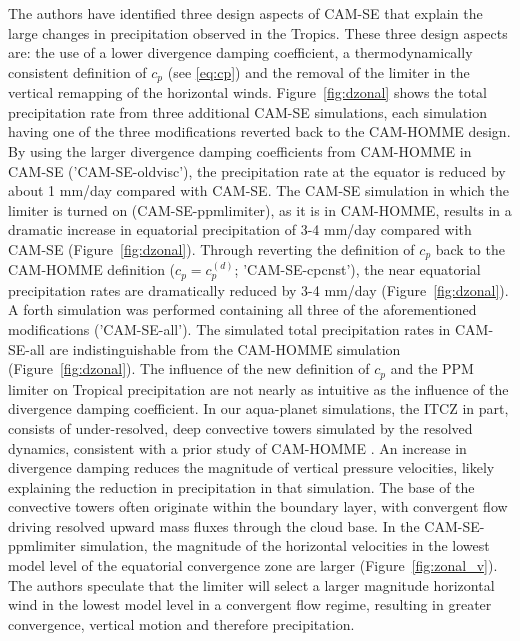 The authors have identified three design aspects of CAM-SE that explain the large changes in precipitation observed in the Tropics. These three design aspects are: the use of a lower divergence damping coefficient, a thermodynamically consistent definition of $c_p$ (see \eqref{eq:cp}) and the removal of the limiter in the vertical remapping of the horizontal winds. Figure~\ref{fig:dzonal} shows the total precipitation rate from three additional CAM-SE simulations, each simulation having one of the three modifications reverted back to the CAM-HOMME design. By using the larger divergence damping coefficients from CAM-HOMME in CAM-SE ('CAM-SE-oldvisc'), the precipitation rate at the equator is reduced by about 1 mm/day compared with CAM-SE. The CAM-SE simulation in which the limiter is turned on (CAM-SE-ppmlimiter), as it is in CAM-HOMME, results in a dramatic increase in equatorial precipitation of 3-4 mm/day compared with CAM-SE (Figure~\ref{fig:dzonal}). Through reverting the definition of $c_p$ back to the CAM-HOMME definition ($c_p = c_p^{(d)}$; 'CAM-SE-cpcnst'), the near equatorial precipitation rates are dramatically reduced by 3-4 mm/day (Figure~\ref{fig:dzonal}). A forth simulation was performed containing all three of the aforementioned modifications ('CAM-SE-all'). The simulated total precipitation rates in CAM-SE-all are indistinguishable from the CAM-HOMME simulation (Figure~\ref{fig:dzonal}). 
The influence of the new definition of $c_p$ and the PPM limiter on Tropical precipitation are not nearly as intuitive as the influence of the divergence damping coefficient. In our aqua-planet simulations, the ITCZ in part, consists of under-resolved, deep convective towers simulated by the resolved dynamics, consistent with a prior study of CAM-HOMME \citep{HR2017JCLIM}. An increase in divergence damping reduces the magnitude of vertical pressure velocities, likely explaining the reduction in precipitation in that simulation. The base of the convective towers often originate within the boundary layer, with convergent flow driving resolved upward mass fluxes through the cloud base. In the CAM-SE-ppmlimiter simulation, the magnitude of the horizontal velocities in the lowest model level of the equatorial convergence zone are larger (Figure~\ref{fig:zonal_v}). The authors speculate that the limiter will select a larger magnitude horizontal wind in the lowest model level in a convergent flow regime, resulting in greater convergence, vertical motion and therefore precipitation. 

